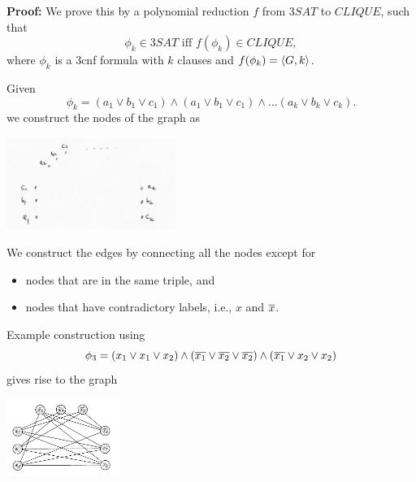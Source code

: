 \documentclass[a4paper,blends,pdf,colorBG,slideColor]{prosper}
\begin{document}
{\small

{\bf Proof:} We prove this by a polynomial reduction $f$ from $3SAT$ to $CLIQUE$,
such that
\[
\phi_k \in 3SAT \mbox{ iff } f(\phi_k) \in CLIQUE,
\]
where $\phi_k$ is a 3cnf formula with $k$ clauses and $f(\phi_k) = \langle {G,k} \rangle$.

Given \[\phi_k = (a_1 \vee b_1 \vee c_1) \wedge (a_1 \vee b_1 \vee c_1) \wedge\ldots (a_k \vee b_k \vee c_k).\]
we construct the nodes of the graph as
\begin{center}
\includegraphics[height=30mm]{images/3sat-graph.eps}
\end{center}
}
\es

{\small
We construct the edges by connecting all the nodes except for
\begin{itemize}
\item nodes that are in the same triple, and
\item nodes that have contradictory labels, i.e., $x$ and $\overline{x}$.
\end{itemize}

Example construction using 
\[
\phi_3=(x_1 \vee x_1 \vee x_2) \wedge
	(\overline{x_1} \vee \overline{x_2} \vee \overline{x_2}) \wedge
	(\overline{x_1} \vee x_2 \vee x_2)
\]
gives rise to the graph
\begin{center}
\includegraphics[height=25mm]{images/3sat-graph-2.eps}
\end{center}
}
\es
\end{document}
